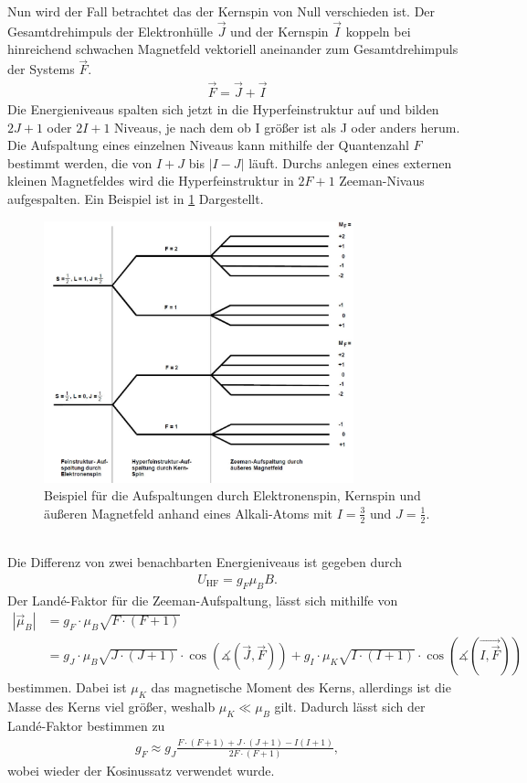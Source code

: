 Nun wird der Fall betrachtet das der Kernspin von Null verschieden ist.
Der Gesamtdrehimpuls der Elektronhülle $\vec{J}$ und der Kernspin $\vec{I}$ koppeln bei hinreichend schwachen Magnetfeld vektoriell aneinander zum Gesamtdrehimpuls der Systems $\vec{F}$.
\begin{align}
	\vec{F}=\vec{J}+\vec{I}
\end{align}
Die Energieniveaus spalten sich jetzt in die Hyperfeinstruktur auf und bilden $2J+1$ oder $2I+1$ Niveaus, je nach dem ob I größer ist als J oder anders herum.
Die Aufspaltung eines einzelnen Niveaus kann mithilfe der Quantenzahl $F$ bestimmt werden, die von $I+J$ bis $|I-J|$ läuft.
Durchs anlegen eines externen kleinen Magnetfeldes wird die Hyperfeinstruktur in $2F+1$ Zeeman-Nivaus aufgespalten.
Ein Beispiel ist in \cref{BeispielAufspaltung} Dargestellt.
\begin{figure}[h!]
	\centering
	\includegraphics[width = 0.8\textwidth]{../Grafiken/BeispielAlkali.pdf}
	\caption{Beispiel für die Aufspaltungen durch Elektronenspin, Kernspin und äußeren Magnetfeld anhand eines Alkali-Atoms mit $I=\frac{3}{2}$ und $J=\frac{1}{2}$.\cite{V21}}\label{BeispielAufspaltung}
\end{figure}\\
Die Differenz von zwei benachbarten Energieniveaus ist gegeben durch
\begin{align}
	U_\text{HF}=g_F\mu_BB.
\end{align}
Der Landé-Faktor für die Zeeman-Aufspaltung, lässt sich mithilfe von
\begin{align}
	|\vec{\mu}_B|&=g_F \cdot \mu_B \sqrt{F \cdot (F+1)}\\
	&=g_J \cdot \mu_B\sqrt{J \cdot (J+1)} \cdot \cos\left(\measuredangle(\vec{J},\vec{F})\right) + g_I \cdot \mu_K \sqrt{I\cdot(I+1)}\cdot \cos\left(\measuredangle(\vec{I,\vec{F}})\right)\nonumber
\end{align}
bestimmen. Dabei ist $\mu_K$ das magnetische Moment des Kerns, allerdings ist die Masse des Kerns viel größer, weshalb $\mu_K \ll \mu_B$ gilt. Dadurch lässt sich der Landé-Faktor bestimmen zu
\begin{align}
	g_F\approx g_J\frac{F\cdot(F+1)+J\cdot(J+1)-I(I+1)}{2F\cdot(F+1)},
\end{align}
wobei wieder der Kosinussatz verwendet wurde.

